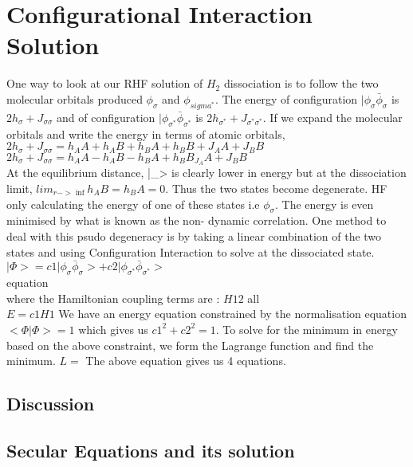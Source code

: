 \documentclass[11pt]{article}   	%
\begin{document}
\section{Configurational Interaction Solution}
	One way to look at our RHF solution of $H_2$ dissociation is to follow the two molecular orbitals produced $\phi_{\sigma}$ and $\phi_{sigma^*}$. 
	The energy of configuration $|\phi_{\sigma} \bar{\phi}_{\sigma}$ is $2h_{\sigma} +J_{\sigma \sigma}$ and of configuration $|\phi_{\sigma^*} \bar{\phi}_{\sigma^*}$ is $2h_{\sigma^*} +J_{\sigma^* \sigma^*}$. If we expand the molecular orbitals and write the energy in terms of atomic orbitals, \\
	$2h_{\sigma} +J_{\sigma \sigma}=h_AA+h_AB+h_BA+h_BB+J_AA+J_BB$\\
	$2h_{\sigma} +J_{\sigma \sigma}=h_AA-h_AB-h_BA+h_BB_J_AA+J_BB$\\
	At the equilibrium distance, |\phi_{\sigma}> is clearly lower in energy but at the dissociation limit, $lim_{r->\inf} h_AB=h_BA=0$. Thus the two states
	become degenerate. HF only calculating the energy of one of these states i.e $\phi_{\sigma}$. The energy is even minimised by what is known as the non-
	dynamic correlation. One method to deal with this psudo degeneracy is by taking a linear combination of the two states and using Configuration Interaction 
	to solve at the dissociated state. \\
	$|\Phi>=c1 |\phi_{\sigma}\bar{\phi}_{\sigma}>+c2|\phi_{\sigma^*}\bar{\phi}_{\sigma^*}>$\\
	\matrix{}{}{} equation\\
	where the Hamiltonian coupling terms are :
	$H12$ all \\
	$E=c1H1$
	We have an energy equation constrained by the normalisation equation $<\Phi|\Phi>=1$ which gives us $c1^2+c2^2=1$.
	To solve for the minimum in energy based on the above constraint, we form the Lagrange function and find the minimum. 
	$L=$
	The above equation gives us 4 equations.
	\subsection{Discussion}
	\subsection{Secular Equations and its solution}
\end{document}
